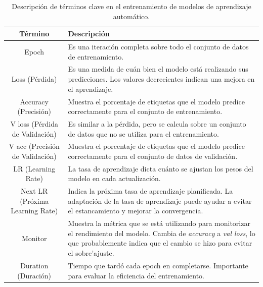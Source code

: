 \begin{table}[ht]
    \centering
    \small
    \begin{tabular}{|c|p{10cm}|}
    \hline
    \textbf{Término} & \textbf{Descripción} \\
    \hline
    Epoch & Es una iteración completa sobre todo el conjunto de datos de entrenamiento. \\
    \hline
    Loss (Pérdida) & Es una medida de cuán bien el modelo está realizando sus predicciones. Los valores decrecientes indican una mejora en el aprendizaje. \\
    \hline
    Accuracy (Precisión) & Muestra el porcentaje de etiquetas que el modelo predice correctamente para el conjunto de entrenamiento. \\
    \hline
    V loss (Pérdida de Validación) & Es similar a la pérdida, pero se calcula sobre un conjunto de datos que no se utiliza para el entrenamiento. \\
    \hline
    V acc (Precisión de Validación) & Muestra el porcentaje de etiquetas que el modelo predice correctamente para el conjunto de datos de validación. \\
    \hline
    LR (Learning Rate) & La tasa de aprendizaje dicta cuánto se ajustan los pesos del modelo en cada actualización. \\
    \hline
    Next LR (Próxima Learning Rate) & Indica la próxima tasa de aprendizaje planificada. La adaptación de la tasa de aprendizaje puede ayudar a evitar el estancamiento y mejorar la convergencia. \\
    \hline
    Monitor & Muestra la métrica que se está utilizando para monitorizar el rendimiento del modelo. Cambia de \textit{accuracy} a \textit{val loss}, lo que probablemente indica que el cambio se hizo para evitar el sobre'ajuste. \\
    \hline
    Duration (Duración) & Tiempo que tardó cada epoch en completarse. Importante para evaluar la eficiencia del entrenamiento. \\
    \hline
    \end{tabular}
    \caption{Descripción de términos clave en el entrenamiento de modelos de aprendizaje automático.}
    \label{table:terminology}
    \end{table}

